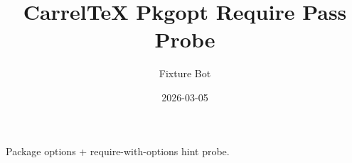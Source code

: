 \documentclass{article}
\title{CarrelTeX Pkgopt Require Pass Probe}
\author{Fixture Bot}
\date{2026-03-05}
\begin{document}
\maketitle

Package options + require-with-options hint probe.
\end{document}
